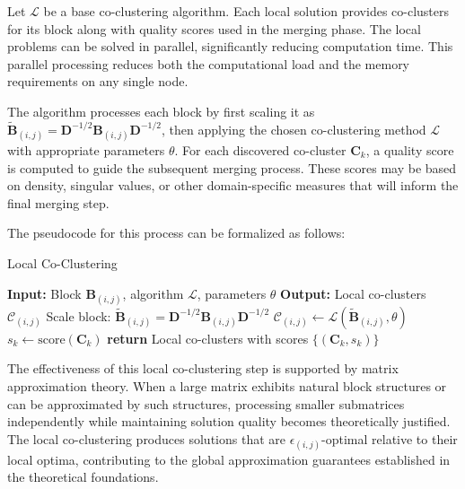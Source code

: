 \documentclass[journal]{IEEEtran}
\theoremstyle{definition}
\theoremstyle{remark} %
\begin{document}
Let $\mathcal{L}$ be a base co-clustering algorithm. Each local solution provides co-clusters for its block along with quality scores used in the merging phase. The local problems can be solved in parallel, significantly reducing computation time. This parallel processing reduces both the computational load and the memory requirements on any single node.

The algorithm processes each block by first scaling it as $\tilde{\mathbf{B}}_{(i,j)} = \mathbf{D}^{-1/2}\mathbf{B}_{(i,j)}\mathbf{D}^{-1/2}$, then applying the chosen co-clustering method $\mathcal{L}$ with appropriate parameters $\theta$. For each discovered co-cluster $\mathbf{C}_k$, a quality score is computed to guide the subsequent merging process. These scores may be based on density, singular values, or other domain-specific measures that will inform the final merging step.

The pseudocode for this process can be formalized as follows:

\begin{algorithm}[t]
    \caption{Local Co-Clustering}
    \begin{algorithmic}
        \STATE \textbf{Input:} Block $\mathbf{B}_{(i,j)}$, algorithm $\mathcal{L}$, parameters $\theta$
        \STATE \textbf{Output:} Local co-clusters $\mathcal{C}_{(i,j)}$
        \STATE Scale block: $\tilde{\mathbf{B}}_{(i,j)} = \mathbf{D}^{-1/2}\mathbf{B}_{(i,j)}\mathbf{D}^{-1/2}$
        \STATE $\mathcal{C}_{(i,j)} \leftarrow \mathcal{L}(\tilde{\mathbf{B}}_{(i,j)}, \theta)$
        \STATE $s_k \leftarrow \text{score}(\mathbf{C}_k)$
        \ENDFOR
        \STATE \textbf{return} Local co-clusters with scores $\{(\mathbf{C}_k, s_k)\}$
    \end{algorithmic}
    \label{alg:local-co-clustering}
\end{algorithm}


The effectiveness of this local co-clustering step is supported by matrix approximation theory. When a large matrix exhibits natural block structures or can be approximated by such structures, processing smaller submatrices independently while maintaining solution quality becomes theoretically justified. The local co-clustering produces solutions that are $\epsilon_{(i,j)}$-optimal relative to their local optima, contributing to the global approximation guarantees established in the theoretical foundations.
\end{document}
